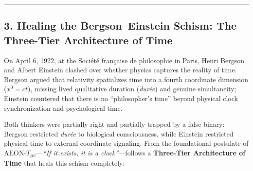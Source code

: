 \documentclass[
]{article}
\begin{document}
\begin{center}\rule{0.5\linewidth}{0.5pt}\end{center}

\subsection{3. Healing the Bergson--Einstein Schism: The Three-Tier
Architecture of
Time}\label{healing-the-bergsoneinstein-schism-the-three-tier-architecture-of-time}

On April 6, 1922, at the Société française de philosophie in Paris,
Henri Bergson and Albert Einstein clashed over whether physics captures
the reality of time. Bergson argued that relativity spatializes time
into a fourth coordinate dimension (\(x^0 = ct\)), missing lived
qualitative duration (\emph{durée}) and genuine simultaneity; Einstein
countered that there is no ``philosopher's time'' beyond physical clock
synchronization and psychological time.

Both thinkers were partially right and partially trapped by a false
binary: Bergson restricted \emph{durée} to biological consciousness,
while Einstein restricted physical time to external coordinate
signaling. From the foundational postulate of
\(\text{AEON-}T_{\mu\nu}\)---\emph{``If it exists, it is a
clock''}---follows a \textbf{Three-Tier Architecture of Time} that heals
this schism completely:
\end{document}
